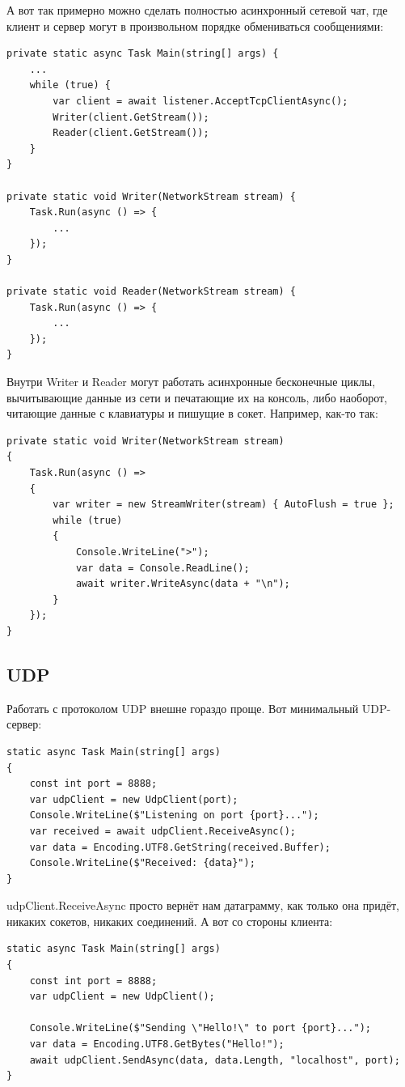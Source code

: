 \documentclass[a5paper]{article}
\begin{document}
А вот так примерно можно сделать полностью асинхронный сетевой чат, где клиент и сервер могут в произвольном порядке обмениваться сообщениями:

\begin{verbatim}
private static async Task Main(string[] args) {
    ...
    while (true) {
        var client = await listener.AcceptTcpClientAsync();
        Writer(client.GetStream());
        Reader(client.GetStream());
    }
}

private static void Writer(NetworkStream stream) {
    Task.Run(async () => {
        ...
    });
}

private static void Reader(NetworkStream stream) {
    Task.Run(async () => {
        ...
    });
}
\end{verbatim}

Внутри Writer и Reader могут работать асинхронные бесконечные циклы, вычитывающие данные из сети и печатающие их на консоль, либо наоборот, читающие данные с клавиатуры и пишущие в сокет. Например, как-то так:

\begin{verbatim}
private static void Writer(NetworkStream stream)
{
    Task.Run(async () =>
    {
        var writer = new StreamWriter(stream) { AutoFlush = true };
        while (true)
        {
            Console.WriteLine(">");
            var data = Console.ReadLine();
            await writer.WriteAsync(data + "\n");
        }
    });
}
\end{verbatim}

\subsection{UDP}

Работать с протоколом UDP внешне гораздо проще. Вот минимальный UDP-сервер:

\begin{verbatim}
static async Task Main(string[] args)
{
    const int port = 8888;
    var udpClient = new UdpClient(port);
    Console.WriteLine($"Listening on port {port}...");
    var received = await udpClient.ReceiveAsync();
    var data = Encoding.UTF8.GetString(received.Buffer);
    Console.WriteLine($"Received: {data}");
}
\end{verbatim}

udpClient.ReceiveAsync просто вернёт нам датаграмму, как только она придёт, никаких сокетов, никаких соединений. А вот со стороны клиента: 

\begin{verbatim}
static async Task Main(string[] args)
{
    const int port = 8888;
    var udpClient = new UdpClient();

    Console.WriteLine($"Sending \"Hello!\" to port {port}...");
    var data = Encoding.UTF8.GetBytes("Hello!");
    await udpClient.SendAsync(data, data.Length, "localhost", port);
}
\end{verbatim}
\end{document}
